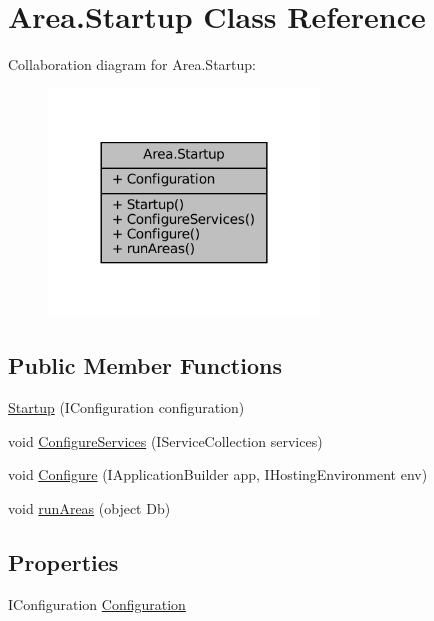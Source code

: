 \hypertarget{classArea_1_1Startup}{}\section{Area.\+Startup Class Reference}
\label{classArea_1_1Startup}


Collaboration diagram for Area.\+Startup\+:
\nopagebreak
\begin{figure}[H]
\begin{center}
\leavevmode
\includegraphics[width=204pt]{classArea_1_1Startup__coll__graph}
\end{center}
\end{figure}
\subsection*{Public Member Functions}
\begin{DoxyCompactItemize}
\item 
\mbox{\hyperlink{classArea_1_1Startup_a9446beab712dc1d1849faa142f6b15eb}{Startup}} (I\+Configuration configuration)
\item 
void \mbox{\hyperlink{classArea_1_1Startup_a590ff5828dfd2beeb8839b0cf54c8e49}{Configure\+Services}} (I\+Service\+Collection services)
\item 
void \mbox{\hyperlink{classArea_1_1Startup_ae1c770b597465dbc651f78efbebb0211}{Configure}} (I\+Application\+Builder app, I\+Hosting\+Environment env)
\item 
void \mbox{\hyperlink{classArea_1_1Startup_a9b27cf1a646fe7912ff7d911f65b1921}{run\+Areas}} (object Db)
\end{DoxyCompactItemize}
\subsection*{Properties}
\begin{DoxyCompactItemize}
\item 
I\+Configuration \mbox{\hyperlink{classArea_1_1Startup_a2af6d803b38886793e2a64b125db35a5}{Configuration}}
\end{DoxyCompactItemize}


